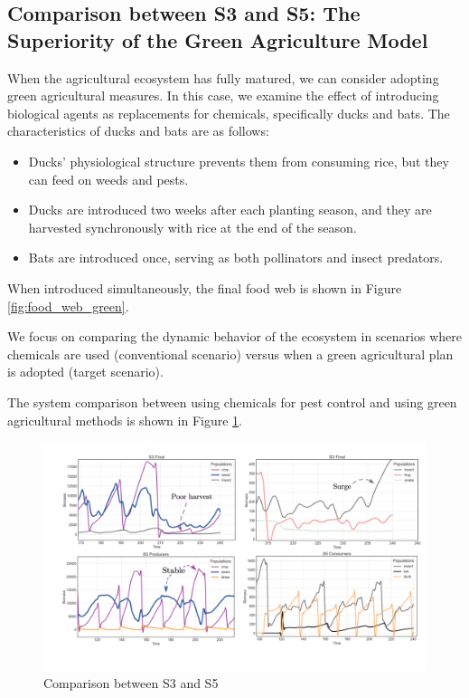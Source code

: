 \documentclass{HZNUMCM}
\begin{document}
      \subsection{Comparison between S3 and S5: The Superiority of the Green Agriculture Model}
        When the agricultural ecosystem has fully matured, 
        we can consider adopting green agricultural measures. In this case, 
        we examine the effect of introducing biological agents as replacements for chemicals, 
        specifically ducks and bats. The characteristics of ducks and bats are as follows:
        \begin{itemize}
            \item Ducks' physiological structure prevents them from consuming rice, but they can feed on weeds and pests.
            \item Ducks are introduced two weeks after each planting season, and they are harvested synchronously with rice at the end of the season.
            \item Bats are introduced once, serving as both pollinators and insect predators.
        \end{itemize}
          When introduced simultaneously, the final food web is shown in Figure \ref{fig:food_web_green}.

          We focus on comparing the dynamic behavior of the ecosystem in scenarios 
          where chemicals are used (conventional scenario) versus when a green agricultural plan is adopted (target scenario).

          The system comparison between using chemicals for pest control and using green agricultural methods is shown in Figure \ref{fig:S3S5}.

          \begin{figure}
            \centering
            \includegraphics[width=\linewidth]{images/S3S5.png}
            \caption{Comparison between S3 and S5}
            \label{fig:S3S5}
          \end{figure}
          
\end{document}
